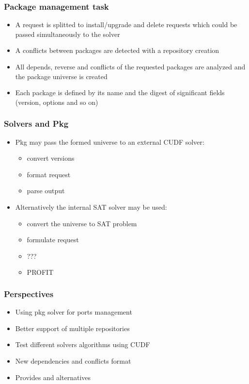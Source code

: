 \documentclass{beamer}
\begin{document}
\begin{frame}
\frametitle{Package management task}
\begin{itemize}
  \item A request is splitted to install/upgrade and delete requests which
  could be passed simultaneously to the solver
  \item A conflicts between packages are detected with a repository creation
  \item All depends, reverse and conflicts of the requested packages are
  analyzed and the package universe is created
  \item Each package is defined by its name and the digest of significant
  fields (version, options and so on)
\end{itemize}
\end{frame}

\begin{frame}
\frametitle{Solvers and Pkg}
\begin{itemize}
  \item Pkg may pass the formed universe to an external CUDF solver:
  \begin{itemize}
    \item convert versions
    \item format request
    \item parse output
  \end{itemize}
  \item Alternatively the internal SAT solver may be used:
  \begin{itemize}
    \item convert the universe to SAT problem
    \item formulate request
    \item ???
    \item PROFIT
  \end{itemize} 
\end{itemize}
\end{frame}

\begin{frame}
\frametitle{Perspectives}

\begin{itemize}
  \item Using pkg solver for ports management
  \item Better support of multiple repositories
  \item Test different solvers algorithms using CUDF
  \item New dependencies and conflicts format
  \item Provides and alternatives
\end{itemize}
\end{frame}
\end{document}

